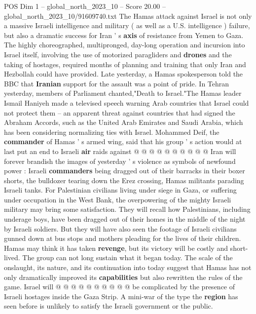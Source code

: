 \begin{textsample}{POS Dim 1 – global\_north\_2023\_10 – Score 20.00 – global\_north\_2023\_10/91609740.txt}  \label{ex:f1_pos_143}
The Hamas attack against Israel is not only a massive Israeli intelligence and military ( as well as a U.S. intelligence ) failure, but also a dramatic success for Iran ' s \textbf{axis} of resistance from Yemen to Gaza.
The highly choreographed, multipronged, day-long operation and incursion into Israel itself, involving the use of motorized paragliders and \textbf{drones} and the taking of hostages, required months of planning and training that only Iran and Hezbollah could have provided.
Late yesterday, a Hamas spokesperson told the BBC that \textbf{Iranian} support for the assault was a point of pride.
In Tehran yesterday, members of Parliament chanted,"Death to Israel."The Hamas leader Ismail Haniyeh made a televised speech warning Arab countries that Israel could not protect them -- an apparent threat against countries that had signed the Abraham Accords, such as the United Arab Emirates and Saudi Arabia, which has been considering normalizing ties with Israel.
Mohammed Deif, the \textbf{commander} of Hamas ' s armed wing, said that his group ' s action would at last put an end to Israeli \textbf{air} raids against @ @ @ @ @ @ @ @ @ @ Iran will forever brandish the images of yesterday ' s violence as symbols of newfound power : Israeli \textbf{commanders} being dragged out of their barracks in their boxer shorts, the bulldozer tearing down the Erez crossing, Hamas militants parading Israeli tanks.
For Palestinian civilians living under siege in Gaza, or suffering under occupation in the West Bank, the overpowering of the mighty Israeli military may bring some satisfaction.
They will recall how Palestinians, including underage boys, have been dragged out of their homes in the middle of the night by Israeli soldiers.
But they will have also seen the footage of Israeli civilians gunned down at bus stops and mothers pleading for the lives of their children.
Hamas may think it has taken \textbf{revenge}, but its victory will be costly and short-lived.
The group can not long sustain what it began today.
The scale of the onslaught, its nature, and its continuation into today suggest that Hamas has not only dramatically improved its \textbf{capabilities} but also rewritten the rules of the game.
Israel will @ @ @ @ @ @ @ @ @ @ be complicated by the presence of Israeli hostages inside the Gaza Strip.
A mini-war of the type the \textbf{region} has seen before is unlikely to satisfy the Israeli government or the public.

\end{textsample}
